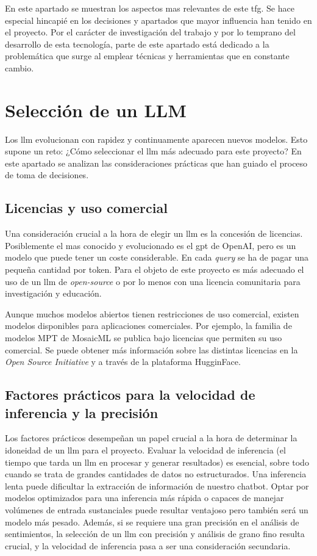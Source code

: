 
En este apartado se muestran los aspectos mas relevantes de este \acrshort{tfg}. Se hace especial hincapié en los decisiones y apartados que mayor influencia han tenido en el proyecto. Por el carácter de investigación del trabajo y por lo temprano del desarrollo de esta tecnología, parte de este apartado está dedicado a la problemática que surge al emplear técnicas y herramientas que en constante cambio.

\section{Selección de un LLM}

Los \acrfull{llm} evolucionan con rapidez y continuamente aparecen nuevos modelos. Esto supone un reto: ¿Cómo seleccionar el \acrshort{llm} más adecuado para este proyecto? En este apartado se analizan las consideraciones prácticas que han guiado el proceso de toma de decisiones.

\subsection{Licencias y uso comercial}
Una consideración crucial a la hora de elegir un \acrshort{llm} es la concesión de licencias. Posiblemente el mas conocido y evolucionado es el \acrshort{gpt} de OpenAI, pero es un modelo que puede tener un coste considerable. En cada \textit{query} se ha de pagar una pequeña cantidad  por token. Para el objeto de este proyecto es más adecuado el uso de un \acrshort{llm} de \textit{open-source} o por lo menos con una licencia comunitaria para investigación y educación.

Aunque muchos modelos abiertos tienen restricciones de uso comercial, existen modelos disponibles para aplicaciones comerciales. Por ejemplo, la familia de modelos MPT de MosaicML se publica bajo licencias que permiten su uso comercial. Se puede obtener más información sobre las distintas licencias en la \textit{Open Source Initiative} y a través de la plataforma HugginFace.

\subsection{Factores prácticos para la velocidad de inferencia y la precisión}
Los factores prácticos desempeñan un papel crucial a la hora de determinar la idoneidad de un \acrshort{llm} para el proyecto. Evaluar la velocidad de inferencia (el tiempo que tarda un \acrshort{llm} en procesar y generar resultados) es esencial, sobre todo cuando se trata de grandes cantidades de datos no estructurados. Una inferencia lenta puede dificultar la extracción de información de nuestro chatbot. Optar por modelos optimizados para una inferencia más rápida o capaces de manejar volúmenes de entrada sustanciales puede resultar ventajoso pero también será un modelo más pesado. Además, si se requiere una gran precisión en el análisis de sentimientos, la selección de un \acrshort{llm} con precisión y análisis de grano fino resulta crucial, y la velocidad de inferencia pasa a ser una consideración secundaria.

